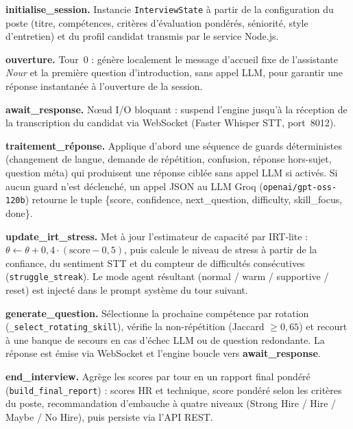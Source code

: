 \begin{sloppypar}
\noindent\textbf{initialise\_session.} Instancie \texttt{InterviewState} à partir de
la configuration du poste (titre, compétences, critères d'évaluation pondérés,
séniorité, style d'entretien) et du profil candidat transmis par le service Node.js.

\noindent\textbf{ouverture.} Tour~0 : génère localement le message d'accueil fixe de
l'assistante \textit{Nour} et la première question d'introduction, sans appel LLM,
pour garantir une réponse instantanée à l'ouverture de la session.

\noindent\textbf{await\_response.} Nœud I/O bloquant : suspend l'engine jusqu'à la
réception de la transcription du candidat via WebSocket (Faster Whisper STT,
port~8012).

\noindent\textbf{traitement\_réponse.} Applique d'abord une séquence de guards
déterministes (changement de langue, demande de répétition, confusion, réponse
hors-sujet, question méta) qui produisent une réponse ciblée sans appel LLM si
activés. Si aucun guard n'est déclenché, un appel JSON au LLM Groq
(\texttt{openai/gpt-oss-120b}) retourne le tuple
\{score, confidence, next\_question, difficulty, skill\_focus, done\}.

\noindent\textbf{update\_irt\_stress.} Met à jour l'estimateur de capacité par
IRT-lite : $\theta \leftarrow \theta + 0{,}4 \cdot (\text{score} - 0{,}5)$, puis
calcule le niveau de stress à partir de la confiance, du sentiment STT et du compteur
de difficultés consécutives (\texttt{struggle\_streak}). Le mode agent résultant
(normal / warm / supportive / reset) est injecté dans le prompt système du tour suivant.

\noindent\textbf{generate\_question.} Sélectionne la prochaine compétence par rotation
(\texttt{\_select\_rotating\_skill}), vérifie la non-répétition (Jaccard $\geq 0{,}65$)
et recourt à une banque de secours en cas d'échec LLM ou de question redondante.
La réponse est émise via WebSocket et l'engine boucle vers \textbf{await\_response}.

\noindent\textbf{end\_interview.} Agrège les scores par tour en un rapport final pondéré
(\texttt{build\_final\_report}) : scores HR et technique, score pondéré selon les
critères du poste, recommandation d'embauche à quatre niveaux (Strong Hire / Hire /
Maybe / No Hire), puis persiste via l'API REST.
\end{sloppypar}

